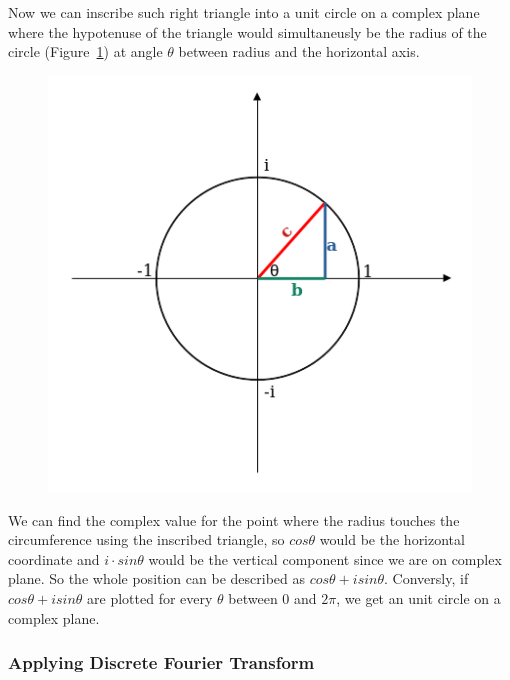 \documentclass[titlepage]{article}
\begin{document}
    Now we can inscribe such right triangle into a unit circle on a complex plane
    where the hypotenuse of the triangle would simultaneusly be the radius of 
    the circle (Figure~\ref{fig:inscribed_triangle}) at angle $\theta$ between
    radius and the horizontal axis.
    \begin{figure}[H]
        \caption{}
        \centering
        \includegraphics[width=0.4\linewidth]{inscribed_triangle}
        \label{fig:inscribed_triangle}
    \end{figure}
    We can find the complex value for the point where the radius touches the circumference
    using the inscribed triangle, so $cos\theta$ would be the horizontal coordinate
    and $i \cdot sin\theta$ would be the vertical component since we are on complex
    plane. So the whole position can be described as $cos\theta + isin\theta$.
    Conversly, if $cos\theta + isin\theta$ are plotted for every $\theta$ between
    $0$ and $2\pi$, we get an unit circle on a complex plane.


\subsubsection{Applying Discrete Fourier Transform}
    
\end{document}
